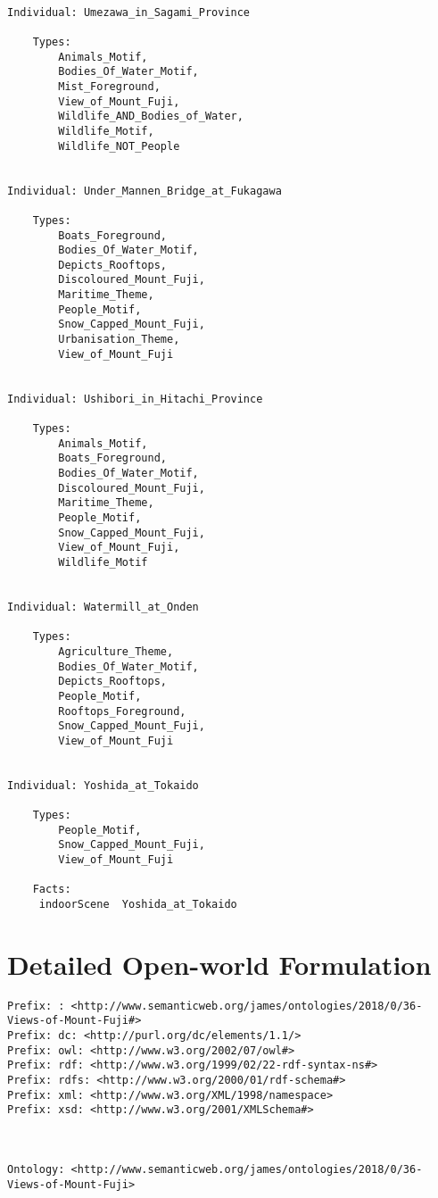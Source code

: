 \documentclass[titlepage,a4paper,12pt,oneside]{book}
\begin{document}
\begin{appendices}
\begin{lstlisting}
    
Individual: Umezawa_in_Sagami_Province

    Types: 
        Animals_Motif,
        Bodies_Of_Water_Motif,
        Mist_Foreground,
        View_of_Mount_Fuji,
        Wildlife_AND_Bodies_of_Water,
        Wildlife_Motif,
        Wildlife_NOT_People
    
    
Individual: Under_Mannen_Bridge_at_Fukagawa

    Types: 
        Boats_Foreground,
        Bodies_Of_Water_Motif,
        Depicts_Rooftops,
        Discoloured_Mount_Fuji,
        Maritime_Theme,
        People_Motif,
        Snow_Capped_Mount_Fuji,
        Urbanisation_Theme,
        View_of_Mount_Fuji
    
    
Individual: Ushibori_in_Hitachi_Province

    Types: 
        Animals_Motif,
        Boats_Foreground,
        Bodies_Of_Water_Motif,
        Discoloured_Mount_Fuji,
        Maritime_Theme,
        People_Motif,
        Snow_Capped_Mount_Fuji,
        View_of_Mount_Fuji,
        Wildlife_Motif
    
    
Individual: Watermill_at_Onden

    Types: 
        Agriculture_Theme,
        Bodies_Of_Water_Motif,
        Depicts_Rooftops,
        People_Motif,
        Rooftops_Foreground,
        Snow_Capped_Mount_Fuji,
        View_of_Mount_Fuji
    
    
Individual: Yoshida_at_Tokaido

    Types: 
        People_Motif,
        Snow_Capped_Mount_Fuji,
        View_of_Mount_Fuji
    
    Facts:  
     indoorScene  Yoshida_at_Tokaido
\end{lstlisting}

\chapter{Detailed Open-world Formulation}
\begin{lstlisting}
Prefix: : <http://www.semanticweb.org/james/ontologies/2018/0/36-Views-of-Mount-Fuji#>
Prefix: dc: <http://purl.org/dc/elements/1.1/>
Prefix: owl: <http://www.w3.org/2002/07/owl#>
Prefix: rdf: <http://www.w3.org/1999/02/22-rdf-syntax-ns#>
Prefix: rdfs: <http://www.w3.org/2000/01/rdf-schema#>
Prefix: xml: <http://www.w3.org/XML/1998/namespace>
Prefix: xsd: <http://www.w3.org/2001/XMLSchema#>



Ontology: <http://www.semanticweb.org/james/ontologies/2018/0/36-Views-of-Mount-Fuji>



\end{lstlisting}
\end{appendices}
\end{document}
